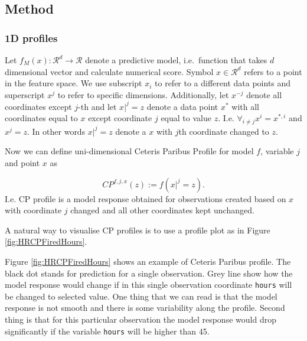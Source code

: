\documentclass[]{krantz}
\theoremstyle{definition}
\theoremstyle{definition}
\theoremstyle{definition}
\theoremstyle{remark}
\begin{document}
\hypertarget{method-5}{%
\subsection{Method}\label{method-5}}

\hypertarget{ceterisParibus1d}{%
\subsubsection{1D profiles}\label{ceterisParibus1d}}

Let \(f_{M}(x): \mathcal R^{d} \rightarrow \mathcal R\) denote a
predictive model, i.e.~function that takes \(d\) dimensional vector and
calculate numerical score. Symbol \(x \in \mathcal R^d\) refers to a
point in the feature space. We use subscript \(x_i\) to refer to a
different data points and superscript \(x^j\) to refer to specific
dimensions. Additionally, let \(x^{-j}\) denote all coordinates except
\(j\)-th and let \(x|^j=z\) denote a data point \(x^*\) with all
coordinates equal to \(x\) except coordinate \(j\) equal to value \(z\).
I.e. \(\forall_{i \neq {j}} x^i = x^{*,i}\) and \(x^j = z\). In other
words \(x|^j=z\) denote a \(x\) with \(j\)th coordinate changed to
\(z\).

Now we can define uni-dimensional Ceteris Paribus Profile for model
\(f\), variable \(j\) and point \(x\) as

\[
CP^{f, j, x}(z) := f(x|^j = z).
\] I.e. CP profile is a model response obtained for observations created
based on \(x\) with coordinate \(j\) changed and all other coordinates
kept unchanged.

A natural way to visualise CP profiles is to use a profile plot as in
Figure \ref{fig:HRCPFiredHours}.

Figure \ref{fig:HRCPFiredHours} shows an example of Ceteris Paribus
profile. The black dot stands for prediction for a single observation.
Grey line show how the model response would change if in this single
observation coordinate \texttt{hours} will be changed to selected value.
One thing that we can read is that the model response is not smooth and
there is some variability along the profile. Second thing is that for
this particular observation the model response would drop significantly
if the variable \texttt{hours} will be higher than 45.
\end{document}
